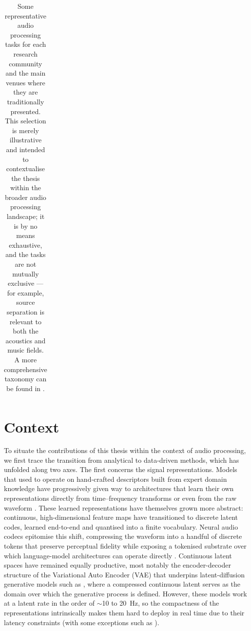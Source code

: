 \begin{table}[t]
\begin{tabular}{p{}|p{}|p{}}
\end{tabular}
\caption{Some representative audio processing tasks for each research community and the main venues where they are traditionally presented. This selection is merely illustrative and intended to contextualise the thesis within the broader audio processing landscape; it is by no means exhaustive, and the tasks are not mutually exclusive --- for example, source separation is relevant to both the acoustics and music fields. A more comprehensive taxonomy can be found in \citep{huang2025dynamic}.}
\label{tab:tasks}
\end{table}


\section{Context}
\label{sec:context}

To situate the contributions of this thesis within the context of audio processing, we first trace the transition from analytical to data-driven methods, which has unfolded along two axes. The first concerns the signal representations. Models
that used to operate on hand-crafted descriptors built from expert
domain knowledge have progressively given way to architectures that learn their own representations directly from time--frequency transforms or even from the raw waveform \citep{pons2019}. These learned representations have themselves grown more abstract: continuous, high-dimensional feature maps have transitioned to discrete latent codes, learned end-to-end and quantised into a finite vocabulary. Neural audio codecs epitomise this shift, compressing the waveform into a handful of discrete tokens that preserve perceptual fidelity
\citep{zeghidour2021soundstream,defossez2022high} while exposing a tokenised
substrate over which language-model architectures can operate directly
\citep{borsos2023audiolm}. Continuous latent spaces have remained equally
productive, most notably the encoder-decoder structure of the Variational Auto Encoder (VAE) that underpins latent-diffusion
generative models such as \citet{evans2025stable}, where a
compressed continuous latent serves as the domain over which the generative
process is defined. However, these models work at a latent rate in the order of $\sim$10 to 20~Hz, so the compactness of the representations intrinsically makes them hard to deploy in real time due to their latency constraints (with some exceptions such as \citealp{gdmlyria2025live,novack2025fast}).

